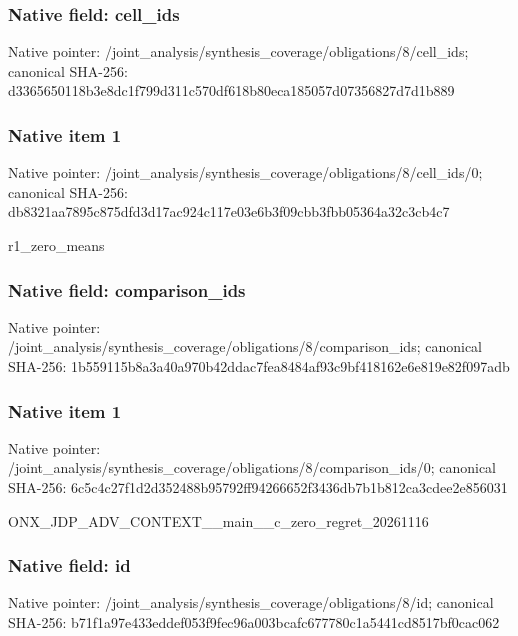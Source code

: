 \documentclass[10pt,a4paper]{article}
\begin{document}
\subsubsection{Native field: cell\_\allowbreak{}ids}
Native pointer: /joint\_\allowbreak{}analysis/synthesis\_\allowbreak{}coverage/obligations/8/cell\_\allowbreak{}ids; canonical SHA-256: d3365650118b3e8dc1f799d311c570df618b80eca185057d07356827d7d1b889

\subsubsection{Native item 1}
Native pointer: /joint\_\allowbreak{}analysis/synthesis\_\allowbreak{}coverage/obligations/8/cell\_\allowbreak{}ids/0; canonical SHA-256: db8321aa7895c875dfd3d17ac924c117e03e6b3f09cbb3fbb05364a32c3cb4c7

\begingroup\raggedright\sloppy r1\_\allowbreak{}zero\_\allowbreak{}means\par\endgroup

\subsubsection{Native field: comparison\_\allowbreak{}ids}
Native pointer: /joint\_\allowbreak{}analysis/synthesis\_\allowbreak{}coverage/obligations/8/comparison\_\allowbreak{}ids; canonical SHA-256: 1b559115b8a3a40a970b42ddac7fea8484af93c9bf418162e6e819e82f097adb

\subsubsection{Native item 1}
Native pointer: /joint\_\allowbreak{}analysis/synthesis\_\allowbreak{}coverage/obligations/8/comparison\_\allowbreak{}ids/0; canonical SHA-256: 6c5c4c27f1d2d352488b95792ff94266652f3436db7b1b812ca3cdee2e856031

\begingroup\raggedright\sloppy ONX\_\allowbreak{}JDP\_\allowbreak{}ADV\_\allowbreak{}CONTEXT\_\allowbreak{}\_\allowbreak{}main\_\allowbreak{}\_\allowbreak{}c\_\allowbreak{}zero\_\allowbreak{}regret\_\allowbreak{}20261116\par\endgroup

\subsubsection{Native field: id}
Native pointer: /joint\_\allowbreak{}analysis/synthesis\_\allowbreak{}coverage/obligations/8/id; canonical SHA-256: b71f1a97e433eddef053f9fec96a003bcafc677780c1a5441cd8517bf0cac062
\end{document}
